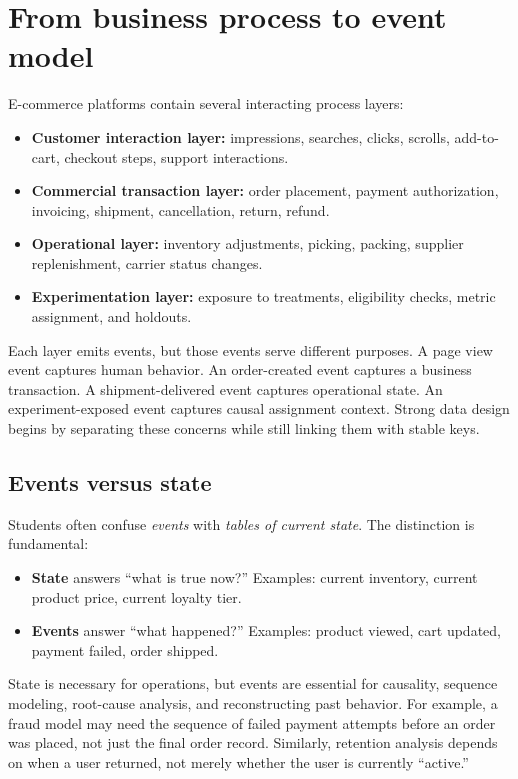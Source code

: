 \section{From business process to event model}
E-commerce platforms contain several interacting process layers:
\begin{itemize}
  \item \textbf{Customer interaction layer:} impressions, searches, clicks, scrolls, add-to-cart, checkout steps, support interactions.
  \item \textbf{Commercial transaction layer:} order placement, payment authorization, invoicing, shipment, cancellation, return, refund.
  \item \textbf{Operational layer:} inventory adjustments, picking, packing, supplier replenishment, carrier status changes.
  \item \textbf{Experimentation layer:} exposure to treatments, eligibility checks, metric assignment, and holdouts.
\end{itemize}

Each layer emits events, but those events serve different purposes.
A page view event captures human behavior.
An order-created event captures a business transaction.
A shipment-delivered event captures operational state.
An experiment-exposed event captures causal assignment context.
Strong data design begins by separating these concerns while still linking them with stable keys.

\subsection{Events versus state}
Students often confuse \emph{events} with \emph{tables of current state}.
The distinction is fundamental:
\begin{itemize}
  \item \textbf{State} answers ``what is true now?'' Examples: current inventory, current product price, current loyalty tier.
  \item \textbf{Events} answer ``what happened?'' Examples: product viewed, cart updated, payment failed, order shipped.
\end{itemize}

State is necessary for operations, but events are essential for causality, sequence modeling, root-cause analysis, and reconstructing past behavior.
For example, a fraud model may need the sequence of failed payment attempts before an order was placed, not just the final order record.
Similarly, retention analysis depends on when a user returned, not merely whether the user is currently ``active.''

